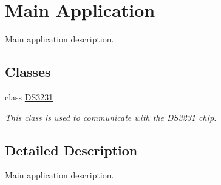 \hypertarget{group__app}{}\section{Main Application}
\label{group__app}


Main application description.  


\subsection*{Classes}
\begin{DoxyCompactItemize}
\item 
class \mbox{\hyperlink{class_d_s3231}{D\+S3231}}
\begin{DoxyCompactList}\small\item\em This class is used to communicate with the \mbox{\hyperlink{class_d_s3231}{D\+S3231}} chip. \end{DoxyCompactList}\end{DoxyCompactItemize}


\subsection{Detailed Description}
Main application description. 


